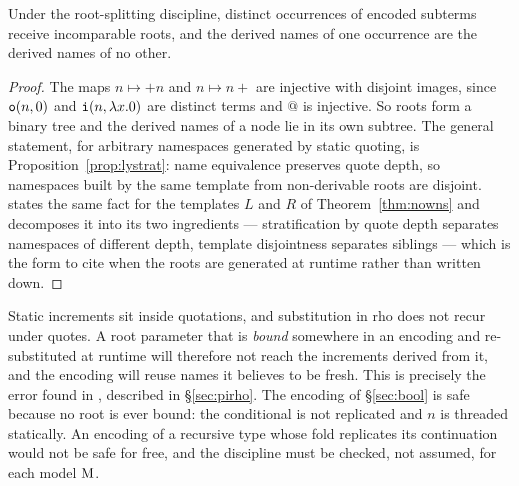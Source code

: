 \documentclass{article}
\begin{document}
\begin{lemma}
\label{lem:names}
    Under the root-splitting discipline, distinct occurrences of encoded subterms receive incomparable roots, and the derived names of one occurrence are the derived names of no other.
\end{lemma}
\begin{proof}
    The maps $n\mapsto +n$ and $n\mapsto n+$ are injective with disjoint images, since $\mathtt{o}(n,0)$ and $\mathtt{i}(n,\lambda x.0)$ are distinct terms and $@$ is injective. So roots form a binary tree and the derived names of a node lie in its own subtree. The general statement, for arbitrary namespaces generated by static quoting, is Proposition~\ref{prop:lystrat}: name equivalence preserves quote depth, so namespaces built by the same template from non-derivable roots are disjoint.  states the same fact for the templates $L$ and $R$ of Theorem~\ref{thm:nowns} and decomposes it into its two ingredients --- stratification by quote depth separates namespaces of different depth, template disjointness separates siblings --- which is the form to cite when the roots are generated at runtime rather than written down.
\end{proof}

\begin{remark}
\label{rem:staticbug}
    Static increments sit inside quotations, and substitution in rho does not recur under quotes. A root parameter that is \emph{bound} somewhere in an encoding and re-substituted at runtime will therefore not reach the increments derived from it, and the encoding will reuse names it believes to be fresh. This is precisely the error \citet{lybech} found in \citet{rho}, described in \S\ref{sec:pirho}. The encoding of \S\ref{sec:bool} is safe because no root is ever bound: the conditional is not replicated and $n$ is threaded statically. An encoding of a recursive type whose fold replicates its continuation would not be safe for free, and the discipline must be checked, not assumed, for each model $\mathrm{M}$.
\end{remark}
\end{document}
